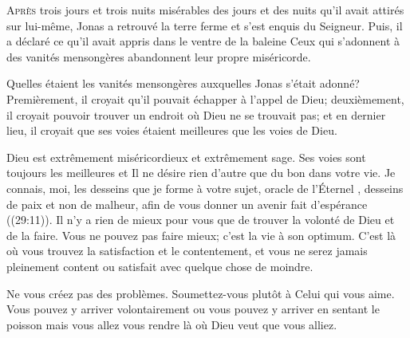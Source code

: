 


\lettrine{A}{près} trois jours et trois nuits misérables
 \ocadr des jours et des nuits qu'il avait attirés sur lui-même,
 Jonas a retrouvé la terre ferme et s'est enquis du Seigneur.
 Puis, il a déclaré ce qu'il avait appris dans le ventre de la baleine\frcolon{}
 \Og Ceux qui s'adonnent à des vanités mensongères abandonnent
 leur propre miséricorde. \Fg{}  

Quelles étaient les vanités mensongères auxquelles Jonas s'était adonné?
 Premièrement, il croyait qu'il pouvait échapper à l'appel de Dieu;
 deuxièmement, il croyait pouvoir trouver un endroit où Dieu
 ne se trouvait pas; et en dernier lieu, il croyait que ses voies
 étaient meilleures que les voies de Dieu. 


Dieu est extrêmement miséricordieux et extrêmement sage.
 Ses voies sont toujours les meilleures et Il ne désire rien d'autre
 que du bon dans votre vie.
 \Og Je connais, moi, les desseins que je forme à votre sujet,
 \ocadr oracle de l'Éternel \fcadr{}, desseins de paix et non de malheur,
 afin de vous donner un avenir fait d'espérance \Fg{} ((29:11)).
 Il n'y a rien de mieux pour vous que de trouver la volonté de Dieu
 et de la faire. Vous ne pouvez pas faire mieux; c'est la vie à son optimum.
 C'est là où vous trouvez la satisfaction et le contentement,
 et vous ne serez jamais pleinement content ou satisfait
 avec quelque chose de moindre. 

Ne vous créez pas des problèmes. Soumettez-vous
 plutôt à Celui qui vous aime.
 Vous pouvez y arriver volontairement ou vous pouvez y arriver en sentant
 le poisson \ocadr mais vous allez vous rendre
 là où Dieu veut que vous alliez. 

\dvrule



